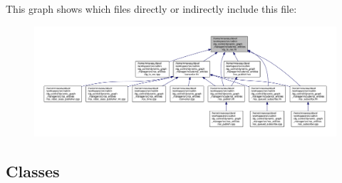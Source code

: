 This graph shows which files directly or indirectly include this file\+:\nopagebreak
\begin{figure}[H]
\begin{center}
\leavevmode
\includegraphics[width=350pt]{dg__to__ros_8hh__dep__incl}
\end{center}
\end{figure}
\subsection*{Classes}
